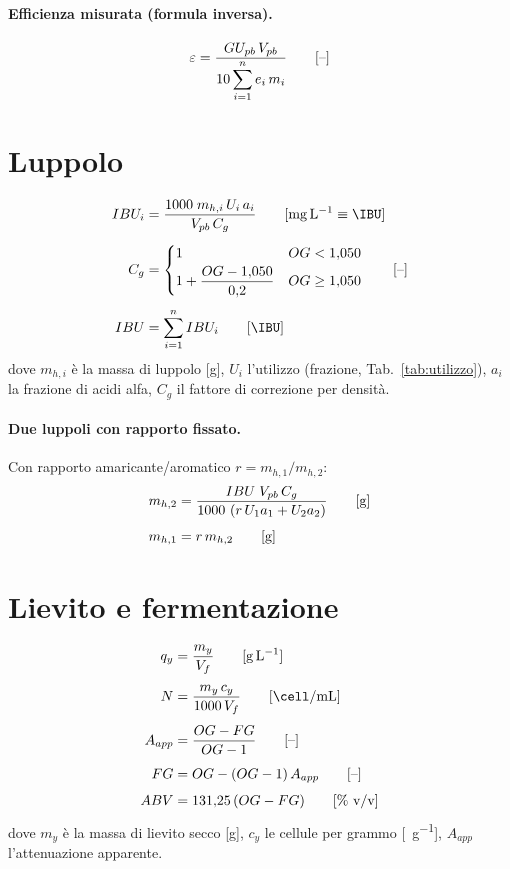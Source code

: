 \paragraph{Efficienza misurata (formula inversa).}
\begin{equation}
\varepsilon = \frac{GU_{pb}\, V_{pb}}{10 \displaystyle\sum_{i=1}^{n} e_i\, m_i} \qquad [\text{--}]
\end{equation}

\section{Luppolo}

\begin{align}
IBU_i &= \frac{1000\; m_{h,i}\, U_i\, a_i}{V_{pb}\, C_g} \un{\si{\milli\gram\per\liter} \equiv \si{\IBU}} \\[4pt]
C_g &=
\begin{cases}
1 & OG < 1{,}050\\[2pt]
1 + \dfrac{OG - 1{,}050}{0{,}2} & OG \ge 1{,}050
\end{cases} \adim \\[4pt]
IBU &= \sum_{i=1}^{n} IBU_i \un{\si{\IBU}}
\end{align}
dove $m_{h,i}$ è la massa di luppolo [\si{\gram}], $U_i$ l'utilizzo (frazione, Tab.~\ref{tab:utilizzo}), $a_i$ la frazione di acidi alfa, $C_g$ il fattore di correzione per densità.

\paragraph{Due luppoli con rapporto fissato.}
Con rapporto amaricante/aromatico $r = m_{h,1}/m_{h,2}$:
\begin{align}
m_{h,2} &= \frac{IBU\; V_{pb}\, C_g}{1000\,\left(r\, U_1 a_1 + U_2 a_2\right)} \qquad [\si{\gram}] \\[4pt]
m_{h,1} &= r\, m_{h,2} \qquad [\si{\gram}]
\end{align}

\section{Lievito e fermentazione}

\begin{align}
q_y &= \frac{m_y}{V_f} \un{\si{\gram\per\liter}} \\[4pt]
N &= \frac{m_y\, c_y}{1000\, V_f} \un{\si{\cell\per\milli\liter}} \\[4pt]
A_{app} &= \frac{OG - FG}{OG - 1} \adim \\[4pt]
FG &= OG - (OG - 1)\, A_{app} \adim \\[4pt]
ABV &= 131{,}25\,(OG - FG) \un{\si{\percent} \text{ v/v}}
\end{align}
dove $m_y$ è la massa di lievito secco [\si{\gram}], $c_y$ le cellule per grammo [\si{\cell\per\gram}], $A_{app}$ l'attenuazione apparente.

